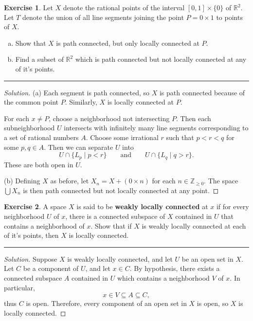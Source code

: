 \documentclass{article}
\theoremstyle{definition}
\newtheorem{exercise}{Exercise}[section]
\begin{document}
\begin{exercise}
  Let $X$ denote the rational points of the interval $[0,1]\times\{0\}$ of $\mathbb{R}^2$. Let $T$ denote the union of all line segments joining the point $P = 0\times 1$ to points of $X$.
  \begin{enumerate}[(a)]
    \item Show that $X$ is path connected, but only locally connected at $P$.
    \item Find a subset of $\mathbb{R}^2$ which is path connected but not locally connected at any of it's points.
  \end{enumerate}
\end{exercise}
\hrule
\begin{proof}[Solution]
  (a) Each segment is path connected, so $X$ is path connected because of the common point $P$. Similarly, $X$ is locally connected at $P$.

  For each $x\ne P$, choose a neighborhood not intersecting $P$. Then each subneighborhood $U$ intersects with infinitely many line segments corresponding to a set of rational numbers $A$. Choose some irrational $r$ such that $p < r < q$ for some $p,q\in A$. Then we can separate $U$ into
  $$U\cap \{L_p\mid p < r\}\qquad\text{and}\qquad U\cap \{L_q\mid q > r\}.$$
  These are both open in $U$.

  (b) Defining $X$ as before, let $X_n = X + (0\times n)$ for each $n\in\mathbb{Z}_{\ge 0}.$ The space $\bigcup X_n$ is then path connected but not locally connected at any point.
\end{proof}

\pagebreak

\begin{exercise}
  A space $X$ is said to be \textbf{weakly locally connected} at $x$ if for every neighborhood $U$ of $x$, there is a connected subspace of $X$ contained in $U$ that contains a neighborhood of $x$. Show that if $X$ is weakly locally connected at each of it's points, then $X$ is locally connected.
\end{exercise}
\hrule
\begin{proof}[Solution]
  Suppose $X$ is weakly locally connected, and let $U$ be an open set in $X$. Let $C$ be a component of $U$, and let $x\in C$. By hypothesis, there exists a connected subspace $A$ contained in $U$ which contains a neighborhood $V$ of $x$. In particular,
  $$x\in V\subseteq A\subseteq C,$$
  thus $C$ is open. Therefore, every component of an open set in $X$ is open, so $X$ is locally connected.
\end{proof}
\end{document}
